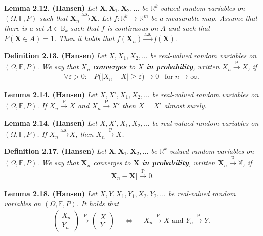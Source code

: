 \documentclass[
]{book}
\begin{document}
\textbf{Lemma 2.12. (Hansen)} \emph{Let \(\mathbf{X},\mathbf{X}_1,\mathbf{X}_2,...\) be \(\mathbb{R}^k\) valued random variables on \((\Omega, \mathbb{F},P)\) such that \(\mathbf{X}_n\stackrel{\text{a.s.}}{\to}\mathbf{X}\). Let \(f : \mathbb{R}^k\to\mathbb{R}^m\) be a measurable map.}
\emph{Assume that there is a set \(A\in \mathbb{B}_k\) such that \(f\) is continuous on \(A\) and such that \(P(\mathbf{X}\in A)=1\). Then it holds that \(f(\mathbf{X}_n)\stackrel{\text{a.s.}}{\to} f(\mathbf{X})\).}

\textbf{Definition 2.13. (Hansen)} \emph{Let \(X,X_1,X_2,...\) be real-valued random variables on \((\Omega,\mathbb{F},P)\). We say that \(X_n\) \textbf{converges} to \(X\) \textbf{in probability}, written \(X_n\stackrel{\text{P}}{\to} X\), if}
\begin{align*}
    \forall \varepsilon>0 :\hspace{10pt} P\big(\vert X_n-X\vert\ge \varepsilon\big)\to 0\hspace{10pt}\text{for}\ n\to \infty.\tag{2.17}
\end{align*}

\textbf{Lemma 2.14. (Hansen)} \emph{Let \(X,X',X_1,X_2,...\) be real-valued random variables on \((\Omega,\mathbb{F},P)\). If \(X_n\stackrel{\text{P}}{\to} X\) and \(X_n\stackrel{\text{P}}{\to} X'\) then \(X=X'\) almost surely.}

\textbf{Lemma 2.14. (Hansen)} \emph{Let \(X,X',X_1,X_2,...\) be real-valued random variables on \((\Omega,\mathbb{F},P)\). If \(X_n\stackrel{\text{a.s.}}{\to} X\), then \(X_n\stackrel{\text{P}}{\to} X\).}

\textbf{Definition 2.17. (Hansen)} \emph{Let \(\mathbf{X},\mathbf{X}_1,\mathbf{X}_2,...\) be \(\mathbb{R}^k\) valued random variables on \((\Omega, \mathbb{F},P)\). We say that \(\mathbf{X}_n\) converges to \(\mathbf{X}\) \textbf{in probability}, written \(\mathbf{X}_n\stackrel{\text{P}}{\to} \mathbb{X}\), if}
\begin{align*}
    \vert \mathbf{X}_n-\mathbf{X}\vert \stackrel{\text{P}}{\to} 0.\tag{2.23}
\end{align*}

\textbf{Lemma 2.18. (Hansen)} \emph{Let \(X,Y,X_1,Y_1,X_2,Y_2,...\) be real-valued random variables on \((\Omega,\mathbb{F},P)\). It holds that}
\begin{align*}
    \begin{pmatrix}
    X_n\\Y_n
    \end{pmatrix}\stackrel{\text{P}}{\to} \begin{pmatrix}
    X\\Y
    \end{pmatrix}\hspace{15pt}\iff \hspace{15pt} X_n\stackrel{\text{P}}{\to} X\text{ and }Y_n\stackrel{\text{P}}{\to} Y.\tag{2.24}
\end{align*}
\end{document}
